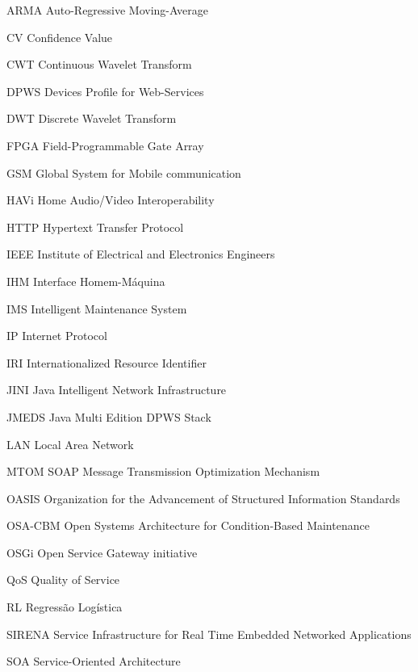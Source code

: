   {ARMA}
  {Auto-Regressive Moving-Average}

  {CV}
  {Confidence Value}

  {CWT}
  {Continuous Wavelet Transform}

  {DPWS}
  {Devices Profile for Web-Services}

  {DWT}
  {Discrete Wavelet Transform}

  {FPGA}
  {Field-Programmable Gate Array}

  {GSM}
  {Global System for Mobile communication}

  {HAVi}
  {Home Audio/Video Interoperability}

  {HTTP}
  {Hypertext Transfer Protocol}

  {IEEE}
  {Institute of Electrical and Electronics Engineers}

  {IHM}
  {Interface Homem-Máquina}

  {IMS}
  {Intelligent Maintenance System}

  {IP}
  {Internet Protocol}

  {IRI}
  {Internationalized Resource Identifier}

  {JINI}
  {Java Intelligent Network Infrastructure}

  {JMEDS}
  {Java Multi Edition DPWS Stack}

  {LAN}
  {Local Area Network}

  {MTOM}
  {SOAP Message Transmission Optimization Mechanism}

  {OASIS}
  {Organization for the Advancement of Structured Information Standards}

  {OSA-CBM}
  {Open Systems Architecture for Condition-Based Maintenance}

  {OSGi}
  {Open Service Gateway initiative}

  {QoS}
  {Quality of Service}

  {RL}
  {Regressão Logística}

  {SIRENA}
  {Service Infrastructure for Real Time Embedded Networked Applications}

  {SOA}
  {Service-Oriented Architecture}

